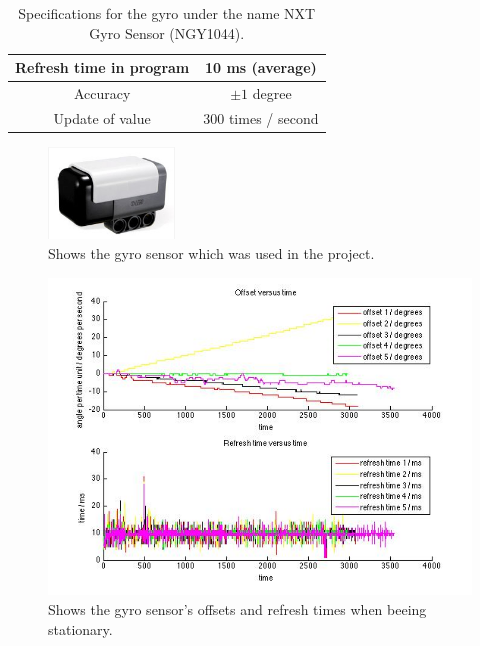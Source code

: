 \documentclass[a4paper]{article}
\begin{document}
        
        \begin{table}[h]
		\center
		\begin{tabular}{|c |c|}
			\hline
			 Refresh time in program & 10 ms (average)   \\ 
			\hline
			Accuracy &  $\pm 1$ degree  \\ 
			\hline
			Update of value & 300 times / second \\
	        		\hline
		\end{tabular}
		\caption{Specifications for the gyro under the name NXT Gyro Sensor (NGY1044).}
		\label{table:Gyro_sensor}
	\end{table}


	\begin{figure}[h]
		\centering
		\includegraphics[width=0.3\textwidth]{NXT_Gyro_Sensor}
		\caption{Shows the gyro sensor which was used in the project.}
		\label{fig:NXT_Gyro_Sensor}
	\end{figure}
	
	\begin{figure}[h]
		\centering
		\includegraphics[width=1.3\textwidth]{plot_gyro_test_final_20150107}
		\caption{Shows the gyro sensor's offsets and refresh times when beeing stationary.}
		\label{fig:Gyro_offsets_refresh_times}
	\end{figure}
	
\end{document}
